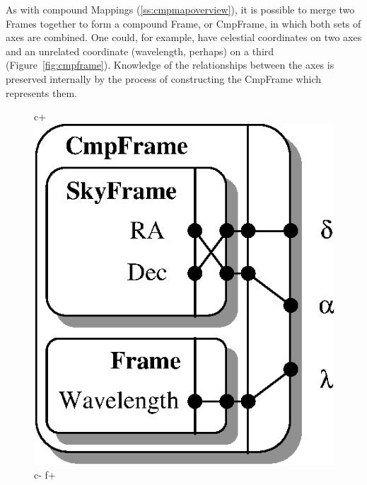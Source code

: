 \documentclass[twoside,11pt]{article}
\newenvironment{latexonly}{}{}
\newcommand{\secref}[1]{\S\ref{#1}}
\renewcommand{\secref}[1]{\ref{#1}}
\begin{document}
{\begin{latexonly}
   As with compound Mappings (\secref{ss:cmpmapoverview}), it is possible
   to merge two Frames together to form a compound Frame, or CmpFrame, in
   which both sets of axes are combined.  One could, for example, have
   celestial coordinates on two axes and an unrelated coordinate
   (wavelength, perhaps) on a third (Figure~\ref{fig:cmpframe}).
   Knowledge of the relationships between the axes is preserved
   internally by the process of constructing the CmpFrame which
   represents them.
   \begin{figure}
   \begin{center}
c+
   \includegraphics[scale=0.85]{sun211_figures/cmpframe.eps}
c-
f+

\end{center}
\end{figure}
\end{latexonly}}
\end{document}

